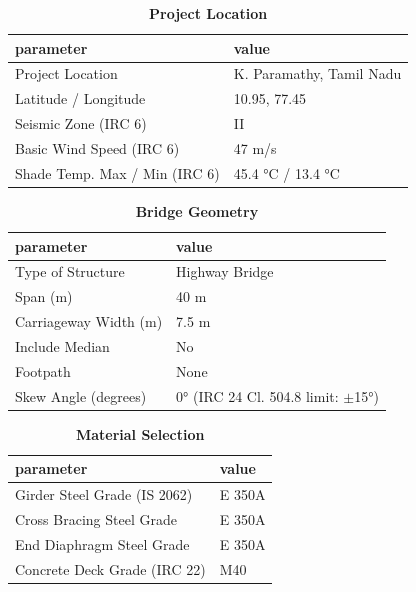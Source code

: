 \documentclass[12pt,a4paper]{report}
\numberwithin{table}{chapter}
\numberwithin{figure}{chapter}
\begin{document}
\begin{table}[H]
\caption{\textbf{Project Location}}
\label{subsec:project-location}
\begin{tabular}{|L{5.5cm}|L{8.5cm}|}
\hline
\textbf{parameter} & \textbf{value} \\
\hline
\textnormal{Project Location} & K. Paramathy, Tamil Nadu \\
\hline
\textnormal{Latitude / Longitude} & 10.95, 77.45 \\
\hline
\textnormal{Seismic Zone (IRC 6)} & II \\
\hline
\textnormal{Basic Wind Speed (IRC 6)} & 47 m/s \\
\hline
\textnormal{Shade Temp. Max / Min (IRC 6)} & 45.4 °C / 13.4 °C \\
\hline
\end{tabular}
\vspace{0.4cm}
\end{table}

\begin{table}[H]
\caption{\textbf{Bridge Geometry}}
\label{subsec:bridge-geometry}
\begin{tabular}{|L{5.5cm}|L{8.5cm}|}
\hline
\textbf{parameter} & \textbf{value} \\
\hline
\textnormal{Type of Structure} & Highway Bridge \\
\hline
\textnormal{Span (m)} & 40 m \\
\hline
\textnormal{Carriageway Width (m)} & 7.5 m \\
\hline
\textnormal{Include Median} & No \\
\hline
\textnormal{Footpath} & None \\
\hline
\textnormal{Skew Angle (degrees)} & 0° (IRC 24 Cl. 504.8 limit: $\pm$15°) \\
\hline
\end{tabular}
\end{table}
\vspace{0.4cm}

\begin{table}[H]
\caption{\textbf{Material Selection}}
\label{subsec:material}
\begin{tabular}{|L{5.5cm}|L{8.5cm}|}
\hline
\textbf{parameter} & \textbf{value} \\
\hline
\textnormal{Girder Steel Grade (IS 2062)} & E 350A \\
\hline
\textnormal{Cross Bracing Steel Grade} & E 350A \\
\hline
\textnormal{End Diaphragm Steel Grade} & E 350A \\
\hline
\textnormal{Concrete Deck Grade (IRC 22)} & M40 \\
\hline
\end{tabular}
\end{table}
\vspace{0.4cm}
\end{document}
